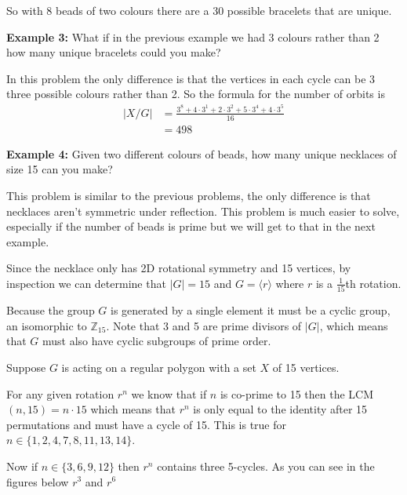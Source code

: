 \documentclass[../main.tex]{subfiles}
\begin{document}
    So with 8 beads of two colours there are a 30 possible bracelets that are unique.
    
    \textbf{Example 3:} What if in the previous example we had 3 colours rather than 2 how many unique bracelets could you make?
    
    In this problem the only difference is that the vertices in each cycle can be 3 three possible colours rather than 2. So the formula for the number of orbits is
    \begin{equation*}
        \begin{split}
            \lvert X / G \rvert & = \frac{3^8 + 4 \cdot 3^1 + 2 \cdot 3^2 + 5 \cdot 3^4 +4 \cdot 3^5}{16} \\
            & = 498
        \end{split}
    \end{equation*}
    
    \textbf{Example 4:} Given two different colours of beads, how many unique necklaces of size 15 can you make?
    
    This problem is similar to the previous problems, the only difference is that necklaces aren't symmetric under reflection. This problem is much easier to solve, especially if the number of beads is prime but we will get to that in the next example. 
    
    Since the necklace only has 2D rotational symmetry and 15 vertices, by inspection we can determine that $\lvert G \rvert = 15$ and $G =\langle r \rangle$ where $r$ is a $\frac{1}{15}$th rotation.
    
    Because the group $G$ is generated by a single element it must be a cyclic group, an isomorphic to $\mathbb{Z}_{15}$. Note that 3 and 5 are prime divisors of $\lvert G \rvert$, which means that $G$ must also have cyclic subgroups of prime order. 
    
    Suppose $G$ is acting on a regular polygon with a set $X$ of 15 vertices.
    
    For any given rotation $r^n$ we know that if $n$ is co-prime to 15 then the LCM$(n, 15) = n \cdot 15$ which means that $r^n$ is only equal to the identity after 15 permutations and must have a cycle of 15. This is true for $ n \in \{1,2,4,7,8,11,13,14\}$.
    
    Now if $n \in \{3,6,9,12\}$ then $r^n$ contains three 5-cycles. As you can see in the figures below $r^3$ and $r^6$  
    
\end{document}
